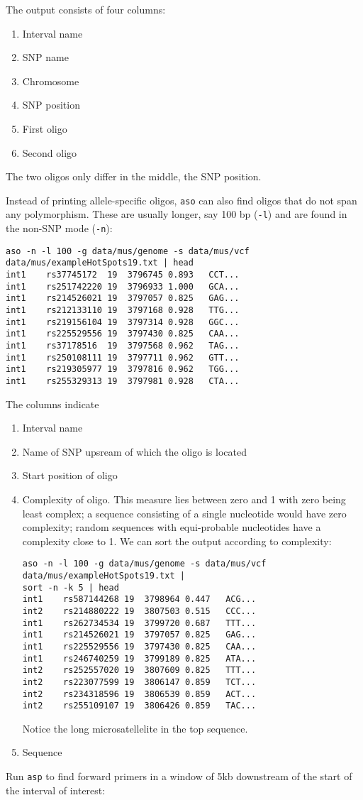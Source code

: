\documentclass{article}
\newcommand{\be}{\begin{enumerate}}
\newcommand{\ee}{\end{enumerate}}
\newcommand{\I}{\item}
\newcommand{\ty}{\texttt}
\begin{document}
The output consists of four columns:
\be
\I Interval name
\I SNP name
\I Chromosome
\I SNP position
\I First oligo
\I Second oligo
\ee
The two oligos only differ in the middle, the SNP position.
\I Instead of printing allele-specific oligos, \ty{aso} can also find
oligos that do not span any polymorphism. These are usually longer,
say 100 bp (\ty{-l}) and are found in the non-SNP mode (\ty{-n}):
\begin{verbatim}
aso -n -l 100 -g data/mus/genome -s data/mus/vcf data/mus/exampleHotSpots19.txt | head
int1	rs37745172	19	3796745	0.893	CCT...
int1	rs251742220	19	3796933	1.000	GCA...
int1	rs214526021	19	3797057	0.825	GAG...
int1	rs212133110	19	3797168	0.928	TTG...
int1	rs219156104	19	3797314	0.928	GGC...
int1	rs225529556	19	3797430	0.825	CAA...
int1	rs37178516	19	3797568	0.962	TAG...
int1	rs250108111	19	3797711	0.962	GTT...
int1	rs219305977	19	3797816	0.962	TGG...
int1	rs255329313	19	3797981	0.928	CTA...
\end{verbatim}
The columns indicate
\begin{enumerate}
\item Interval name
\item Name of SNP upsream of which the oligo is located
\item Start position of oligo
\item Complexity of oligo. This measure lies between zero and 1 with
  zero being least complex; a sequence consisting of a single
  nucleotide would have zero complexity; random sequences with
  equi-probable nucleotides have a complexity close to 1. We can sort
  the output according to complexity:
\begin{verbatim}
aso -n -l 100 -g data/mus/genome -s data/mus/vcf data/mus/exampleHotSpots19.txt | 
sort -n -k 5 | head
int1	rs587144268	19	3798964	0.447	ACG...
int2	rs214880222	19	3807503	0.515	CCC...
int1	rs262734534	19	3799720	0.687	TTT...
int1	rs214526021	19	3797057	0.825	GAG...
int1	rs225529556	19	3797430	0.825	CAA...
int1	rs246740259	19	3799189	0.825	ATA...
int2	rs252557020	19	3807609	0.825	TTT...
int2	rs223077599	19	3806147	0.859	TCT...
int2	rs234318596	19	3806539	0.859	ACT...
int2	rs255109107	19	3806426	0.859	TAC...
\end{verbatim}
Notice the long microsatellelite in the top sequence. 
\item Sequence
\end{enumerate}
\I Run \ty{asp} to find forward primers in a window of 5kb downstream
of the start of the interval of interest:
\end{document}
